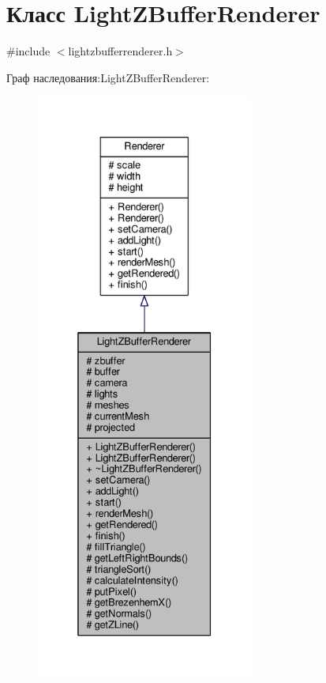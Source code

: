 \hypertarget{class_light_z_buffer_renderer}{}\section{Класс Light\+Z\+Buffer\+Renderer}
\label{class_light_z_buffer_renderer}


{\ttfamily \#include $<$lightzbufferrenderer.\+h$>$}



Граф наследования\+:Light\+Z\+Buffer\+Renderer\+:
\nopagebreak
\begin{figure}[H]
\begin{center}
\leavevmode
\includegraphics[height=550pt]{db/dd8/class_light_z_buffer_renderer__inherit__graph}
\end{center}
\end{figure}


